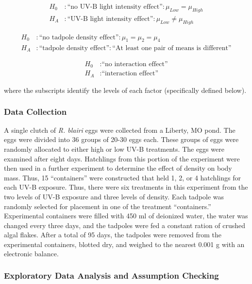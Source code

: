 \documentclass[10pt,openany]{book}\usepackage[]{graphicx}\usepackage[]{color}
\begin{document}
\[ \begin{split}
   H_{0}&: \text{``no UV-B light intensity effect''}: \mu_{Low} = \mu_{High} \\
   H_{A}&: \text{``UV-B light intensity effect''}: \mu_{Low} \neq \mu_{High}
\end{split} \]

\[ \begin{split}
   H_{0}&: \text{``no tadpole density effect''}: \mu_{1} = \mu_{2} = \mu_{4} \\
   H_{A}&: \text{``tadpole density effect''}: \text{``At least one pair of means is different''}
\end{split} \]

\[ \begin{split}
   H_{0}&: \text{``no interaction effect''} \\
   H_{A}&: \text{``interaction effect''}
\end{split} \]

where the subscripts identify the levels of each factor (specifically defined below).

\subsubsection*{Data Collection}
A single clutch of \emph{R. blairi} eggs were collected from a Liberty, MO pond.  The eggs were divided into 36 groups of 20-30 eggs each.  These groups of eggs were randomly allocated to either high or low UV-B treatments.  The eggs were examined after eight days.  Hatchlings from this portion of the experiment were then used in a further experiment to determine the effect of density on body mass.  Thus, 15 ``containers'' were constructed that held 1, 2, or 4 hatchlings for each UV-B exposure.  Thus, there were six treatments in this experiment from the two levels of UV-B exposure and three levels of density.  Each tadpole was randomly selected for placement in one of the treatment ``containers.''  Experimental containers were filled with 450 ml of deionized water, the water was changed every three days, and the tadpoles were fed a constant ration of crushed algal flakes.  After a total of 95 days, the tadpoles were removed from the experimental containers, blotted dry, and weighed to the nearest 0.001 g with an electronic balance.

\subsubsection*{Exploratory Data Analysis and Assumption Checking}
\end{document}
